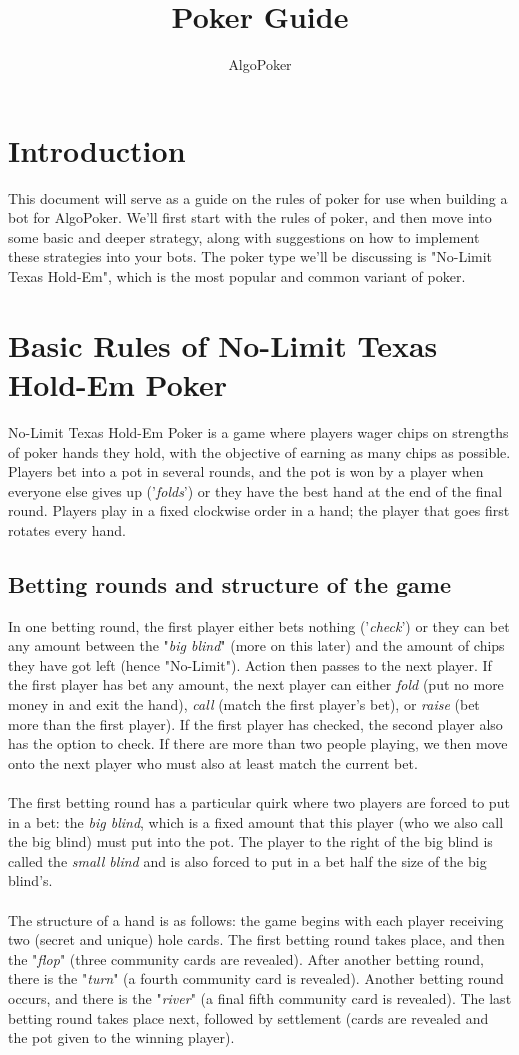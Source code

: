 \documentclass{article}
\title{Poker Guide}
\author{AlgoPoker}
\begin{document}
\maketitle
\tableofcontents
\newpage 
\section{Introduction}
This document will serve as a guide on the rules of poker for use when building a bot for AlgoPoker. We'll first start with the rules of poker, and then move into some basic and deeper strategy, along with suggestions on how to implement these strategies into your bots. The poker type we'll be discussing is "No-Limit Texas Hold-Em", which is the most popular and common variant of poker.
\section{Basic Rules of No-Limit Texas Hold-Em Poker}
No-Limit Texas Hold-Em Poker is a game where players wager chips on strengths of poker hands they hold, with the objective of earning as many chips as possible. Players bet into a pot in several rounds, and the pot is won by a player when everyone else gives up ('\emph{folds}') or they have the best hand at the end of the final round. Players play in a fixed clockwise order in a hand; the player that goes first rotates every hand. 
\subsection{Betting rounds and structure of the game}
In one betting round, the first player either bets nothing ('\emph{check}') or they can bet any amount between the "\emph{big blind}" (more on this later) and the amount of chips they have got left (hence "No-Limit"). Action then passes to the next player. If the first player has bet any amount, the next player can either \emph{fold} (put no more money in and exit the hand), \emph{call} (match the first player's bet), or \emph{raise} (bet more than the first player). If the first player has checked, the second player also has the option to check. If there are more than two people playing, we then move onto the next player who must also at least match the current bet.\\\\
The first betting round has a particular quirk where two players are forced to put in a bet: the \emph{big blind}, which is a fixed amount that this player (who we also call the big blind) must put into the pot. The player to the right of the big blind is called the \emph{small blind} and is also forced to put in a bet half the size of the big blind's.\\\\
The structure of a hand is as follows: the game begins with each player receiving two (secret and unique) hole cards. The first betting round takes place, and then the "\emph{flop}" (three community cards are revealed). After another betting round, there is the "\emph{turn}" (a fourth community card is revealed). Another betting round occurs, and there is the "\emph{river}" (a final fifth community card is revealed). The last betting round takes place next, followed by settlement (cards are revealed and the pot given to the winning player).
\end{document}
